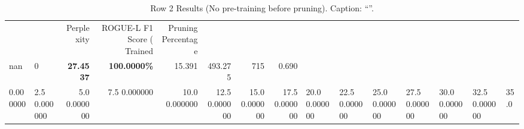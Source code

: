 \begin{table}
\caption{Row 2 Results (No pre-training before pruning). \ifshowcaption{}Caption: ``''.\fi}
\label{tab:evaluation-pipeline-2-untrained}
\begin{tabular}{llrrrrrr}
 &  & Perplexity & ROGUE-L F1 Score (%
Trained & Pruning Percentage &  &  &  &  &  &  \\
nan & 0 & \bfseries 27.4537 & \bfseries 100.0000\% & 15.391 & 493.275 & 715 & 0.690 \\
0.000000 & 2.5%
0.000000 & 5.0%
0.000000 & 7.5%
0.000000 & 10.0%
0.000000 & 12.5%
0.000000 & 15.0%
0.000000 & 17.5%
0.000000 & 20.0%
0.000000 & 22.5%
0.000000 & 25.0%
0.000000 & 27.5%
0.000000 & 30.0%
0.000000 & 32.5%
0.000000 & 35.0%

\end{tabular}
\end{table}
